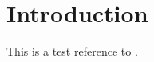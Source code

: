 \chapter{Introduction}
\setcounter{page}{1}


This is a test reference to \autocite{king_anthony_2022}.